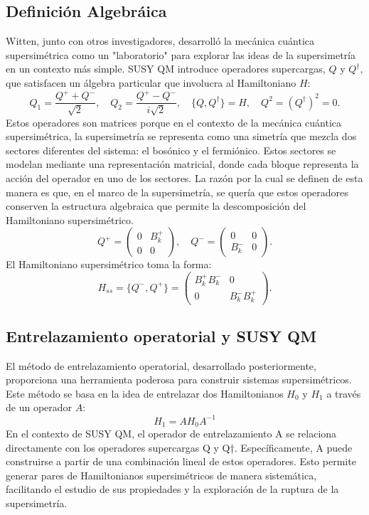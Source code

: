 \documentclass[%
 aip,
 jmp,%
 amsmath,amssymb,
 reprint,
]{revtex4-2}
\begin{document}
\subsection{Definición Algebráica}
Witten, junto con otros investigadores, desarrolló la mecánica cuántica supersimétrica como un "laboratorio" para explorar las ideas de la supersimetría en un contexto más simple. SUSY QM introduce operadores supercargas, $Q$ y $Q^{\dagger}$, que satisfacen un álgebra particular que involucra al Hamiltoniano $H$:
\begin{equation}
Q_1 = \frac{Q^+ + Q^-}{\sqrt{2}}, \quad
Q_2 = \frac{Q^+ - Q^-}{i\sqrt{2}}, \quad
\{Q, Q^{\dagger}\} = H, \quad Q^2 = (Q^{\dagger})^2 = 0.
\end{equation}
Estos operadores son matrices porque en el contexto de la mecánica cuántica supersimétrica, la supersimetría se representa como una simetría que mezcla dos sectores diferentes del sistema: el bosónico y el fermiónico. Estos sectores se modelan mediante una representación matricial, donde cada bloque representa la acción del operador en uno de los sectores.
La razón por la cual se definen de esta manera es que, en el marco de la supersimetría, se quería que estos operadores conserven la estructura algebraica que permite la descomposición del Hamiltoniano supersimétrico.
\begin{equation}
Q^+ = \begin{pmatrix} 0 & B_k^+ \\ 0 & 0 \end{pmatrix}, \quad Q^- = \begin{pmatrix} 0 & 0 \\ B_k^- & 0 \end{pmatrix}.
\end{equation}
El Hamiltoniano supersimétrico toma la forma:
\begin{equation}
H_{ss} = \{Q^-, Q^+\} = \begin{pmatrix} B_k^+ B_k^- & 0 \\ 0 & B_k^- B_k^+ \end{pmatrix}.
\end{equation}
\subsection{Entrelazamiento operatorial y SUSY QM}
El método de entrelazamiento operatorial, desarrollado posteriormente, proporciona una herramienta poderosa para construir sistemas supersimétricos. Este método se basa en la idea de entrelazar dos Hamiltonianos \( H_0 \) y \( H_1 \) a través de un operador \( A \):
\begin{equation}
H_1 = A H_0 A^{-1}
\end{equation}
En el contexto de SUSY QM, el operador de entrelazamiento A se relaciona directamente con los operadores supercargas Q y Q†. Específicamente, A puede construirse a partir de una combinación lineal de estos operadores. Esto permite generar pares de Hamiltonianos supersimétricos de manera sistemática, facilitando el estudio de sus propiedades y la exploración de la ruptura de la supersimetría.
\end{document}
